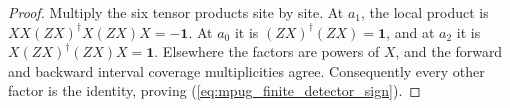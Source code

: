 \begin{proof}\leanok
    Multiply the six tensor products site by site. At $a_1$, the local
    product is $XX(ZX)^{\dagger}X(ZX)X=-\mathbf 1$.
    At $a_0$ it is $(ZX)^{\dagger}(ZX)=\mathbf 1$, and at $a_2$ it is
    $X(ZX)^{\dagger}(ZX)X=\mathbf 1$. Elsewhere the factors are powers of
    $X$, and the forward and backward interval coverage multiplicities agree.
    Consequently every other factor is the identity, proving
    (\ref{eq:mpug_finite_detector_sign}).
\end{proof}
